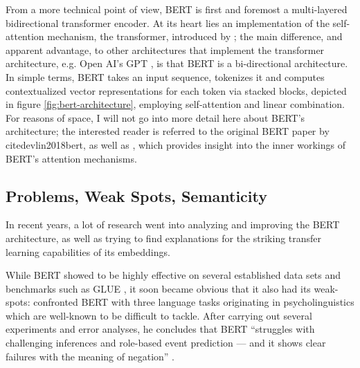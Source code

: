 From a more technical point of view, BERT is first and foremost a multi-layered bidirectional
transformer encoder. At its heart lies an implementation of the self-attention mechanism, the
transformer, introduced by \cite{vaswani2017attention}; the main difference, and apparent
advantage, to other architectures that implement the transformer architecture, e.g. Open AI's GPT
\citep{radford2018improving}, is that BERT is a bi-directional architecture. In simple terms,
BERT takes an input sequence, tokenizes it and computes contextualized vector representations
for each token via stacked blocks, depicted in figure \ref{fig:bert-architecture}, employing
self-attention and linear combination. For reasons of space, I will not go into more detail
here about BERT's architecture; the interested reader is referred to the original BERT paper by
cite{devlin2018bert}, as well as \cite{clark2019does}, which provides insight into the inner
workings of BERT's attention mechanisms.






\subsection{Problems, Weak Spots, Semanticity}
\label{sec:problems}

In recent years, a lot of research went into analyzing and improving the BERT architecture, as well
as trying to find explanations for the striking transfer learning capabilities of its  embeddings.

While BERT showed to be highly effective on several established data sets and
benchmarks such as GLUE \citep{wang2018glue}, it soon became obvious that it
also had its weak-spots: \citeauthor{ettinger2020bert} confronted BERT with
three language tasks originating in psycholinguistics which are well-known
to be difficult to tackle. After carrying out several experiments and error
analyses, he concludes that BERT ``struggles with challenging inferences and
role-based event prediction --- and it shows clear failures with the meaning
of negation'' \citep[p.~46]{ettinger2020bert}.

